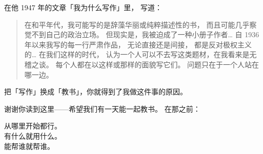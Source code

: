 在他 1947 年的文章「我为什么写作」里，
写道：

\begin{quote}

  在和平年代，我可能写的是辞藻华丽或纯粹描述性的书，
  而且可能几乎察觉不到自己的政治立场。
  但现实是，我被迫成了一种小册子作者{\ldots}
  自 1936 年以来我写的每一行严肃作品，
  无论直接还是间接，
  都是反对极权主义的{\ldots}
  在我们这样的时代，
  认为一个人可以不去写这类题材，在我看来是无稽之谈。
  每个人都在以这样或那样的面貌写它们。
  问题只在于一个人站在哪一边。

\end{quote}

\noindent
把「写作」换成「教书」，你就得到了我做这件事的原因。

\vspace{\baselineskip}

\noindent
谢谢你读到这里——希望我们有一天能一起教书。
在那之前：

\begin{center}

从哪里开始都行。\\
有什么就用什么。\\
能帮谁就帮谁。

\end{center}
